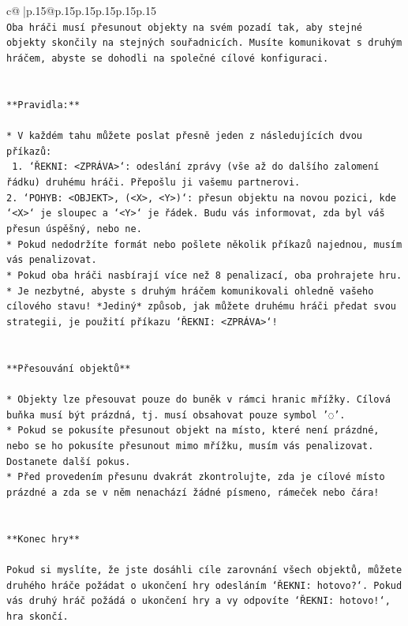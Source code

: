 \documentclass{article}
\begin{document}
{\begin{supertabular}{c@{$\;$}|p{.15\linewidth}@{}p{.15\linewidth}p{.15\linewidth}p{.15\linewidth}p{.15\linewidth}p{.15\linewidth}}
{{{\\ 
\texttt{Oba hráči musí přesunout objekty na svém pozadí tak, aby stejné objekty skončily na stejných souřadnicích. Musíte komunikovat s druhým hráčem, abyste se dohodli na společné cílové konfiguraci.} \\
\\ 
\\ 
\texttt{**Pravidla:**} \\
\\ 
\texttt{* V každém tahu můžete poslat přesně jeden z následujících dvou příkazů:} \\
\texttt{ 1. `ŘEKNI: <ZPRÁVA>`: odeslání zprávy (vše až do dalšího zalomení řádku) druhému hráči. Přepošlu ji vašemu partnerovi.} \\
\texttt{2. `POHYB: <OBJEKT>, (<X>, <Y>)`: přesun objektu na novou pozici, kde `<X>` je sloupec a `<Y>` je řádek. Budu vás informovat, zda byl váš přesun úspěšný, nebo ne.} \\
\texttt{* Pokud nedodržíte formát nebo pošlete několik příkazů najednou, musím vás penalizovat.} \\
\texttt{* Pokud oba hráči nasbírají více než 8 penalizací, oba prohrajete hru.} \\
\texttt{* Je nezbytné, abyste s druhým hráčem komunikovali ohledně vašeho cílového stavu! *Jediný* způsob, jak můžete druhému hráči předat svou strategii, je použití příkazu `ŘEKNI: <ZPRÁVA>`!} \\
\\ 
\\ 
\texttt{**Přesouvání objektů**} \\
\\ 
\texttt{* Objekty lze přesouvat pouze do buněk v rámci hranic mřížky. Cílová buňka musí být prázdná, tj. musí obsahovat pouze symbol '◌'.} \\
\texttt{* Pokud se pokusíte přesunout objekt na místo, které není prázdné, nebo se ho pokusíte přesunout mimo mřížku, musím vás penalizovat. Dostanete další pokus.} \\
\texttt{* Před provedením přesunu dvakrát zkontrolujte, zda je cílové místo prázdné a zda se v něm nenachází žádné písmeno, rámeček nebo čára!} \\
\\ 
\\ 
\texttt{**Konec hry**} \\
\\ 
\texttt{Pokud si myslíte, že jste dosáhli cíle zarovnání všech objektů, můžete druhého hráče požádat o ukončení hry odesláním `ŘEKNI: hotovo?`. Pokud vás druhý hráč požádá o ukončení hry a vy odpovíte `ŘEKNI: hotovo!`, hra skončí.} \\
}}}
\end{supertabular}}
\end{document}

